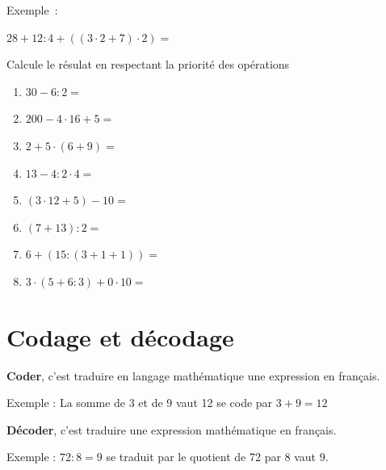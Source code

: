 \documentclass[../../syllabus_1.tex]{subfiles}
\begin{document}
\vfil

Exemple~:

\(28 + 12:4 + \left((3\cdot2 + 7) \cdot 2\right) =\)

\newpage

\begin{exercise}
    Calcule le résulat en respectant la priorité des opérations

    \begin{enumerate}[cols=2, itemsep=4cm]
        \item \(30 - 6:2 =\)
        \item \(200 - 4 \cdot 16 + 5 =\)
        \item \(2 + 5 \cdot (6 + 9) =\)
        \item \(13 - 4 : 2 \cdot 4=\)
        \item \((3 \cdot 12 + 5) - 10 =\)
        \item \((7+13) :2 =\)
        \item \(6 +(15:(3+1+1)) =\)
        \item \(3\cdot(5 + 6 : 3) + 0 \cdot 10=\)
    \end{enumerate}
    \vspace*{4cm}
\end{exercise}

\newpage

\section{Codage et décodage}

\textbf{Coder}, c'est traduire en langage mathématique
une expression en français.

Exemple : La somme de 3 et de 9 vaut 12 se code par
\(3 + 9 = 12\)

\textbf{Décoder}, c'est traduire une expression
mathématique en français.

Exemple : \(72:8 = 9\) se traduit par le
quotient de 72 par 8 vaut 9.
\end{document}
